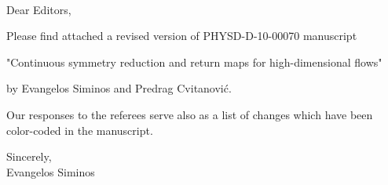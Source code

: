 \documentclass[12pt]{letter}
\begin{document}
\begin{letter}{
\\

}


\opening{Dear Editors,}

Please find attached a revised version of PHYSD-D-10-00070 manuscript

"Continuous symmetry reduction and return maps for high-dimensional flows"

by Evangelos Siminos and Predrag Cvitanovi\'c.

Our responses to the referees serve also as a list of changes which have
been color-coded in the manuscript.

\closing{Sincerely,\\ Evangelos Siminos}


\end{letter}
\end{document}

